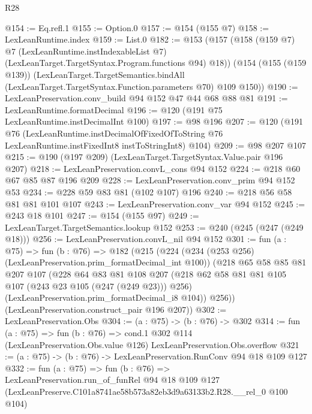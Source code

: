 \begin{lexlean}{R28}
\begin{coremodule}
@154 := Eq.refl.{1}
@155 := Option.{0}
@157 := @154 (@155 @7)
@158 := LexLeanRuntime.index
@159 := List.{0}
@182 := @153
    (@157
      (@158
        (@159 @7)
        @7
        (LexLeanRuntime.instIndexableList @7)
        (LexLeanTarget.TargetSyntax.Program.functions @94)
        @18))
    (@154
      (@155 (@159 @139))
      (LexLeanTarget.TargetSemantics.bindAll
        (LexLeanTarget.TargetSyntax.Function.parameters @70)
        @109
        @150))
@190 := LexLeanPreservation.conv_build @94 @152 @47 @44 @68 @88 @81
@191 := LexLeanRuntime.formatDecimal
@196 := @120 (@191 @75 LexLeanRuntime.instDecimalInt @100)
@197 := @98 @196
@207 := @120
    (@191
      @76
      (LexLeanRuntime.instDecimalOfFixedOfToString
        @76
        LexLeanRuntime.instFixedInt8
        instToStringInt8)
      @104)
@209 := @98 @207 @107
@215 := @190 (@197 @209) (LexLeanTarget.TargetSyntax.Value.pair @196 @207)
@218 := LexLeanPreservation.convL_cons @94 @152
@224 := @218 @60 @67 @85 @87 @196 @209
@228 := LexLeanPreservation.conv_prim @94 @152 @53
@234 := @228 @59 @83 @81 (@102 @107) @196
@240 := @218 @56 @58 @81 @81 @101 @107
@243 := LexLeanPreservation.conv_var @94 @152
@245 := @243 @18 @101
@247 := @154 (@155 @97)
@249 := LexLeanTarget.TargetSemantics.lookup @152
@253 := @240 (@245 (@247 (@249 @18)))
@256 := LexLeanPreservation.convL_nil @94 @152
@301 := fun (a : @75) =>
  fun (b : @76) =>
  @182
    (@215
      (@224
        (@234 (@253 @256) (LexLeanPreservation.prim_formatDecimal_int @100))
        (@218
          @65
          @58
          @85
          @81
          @207
          @107
          (@228
            @64
            @83
            @81
            @108
            @207
            (@218 @62 @58 @81 @81 @105 @107 (@243 @23 @105 (@247 (@249 @23))) @256)
            (LexLeanPreservation.prim_formatDecimal_i8 @104))
          @256))
      (LexLeanPreservation.construct_pair @196 @207))
@302 := LexLeanPreservation.Obs
@304 := (a : @75) -> (b : @76) -> @302
@314 := fun (a : @75) =>
  fun (b : @76) =>
  cond.{1} @302 @114 (LexLeanPreservation.Obs.value @126) LexLeanPreservation.Obs.overflow
@321 := (a : @75) -> (b : @76) -> LexLeanPreservation.RunConv @94 @18 @109 @127
@332 := fun (a : @75) =>
  fun (b : @76) =>
  LexLeanPreservation.run_of_funRel
    @94
    @18
    @109
    @127
    (LexLeanPreserve.C101a8741ae58b573a82eb3d9a63133b2.R28.__rel_0 @100 @104)
\end{coremodule}
\end{lexlean}
